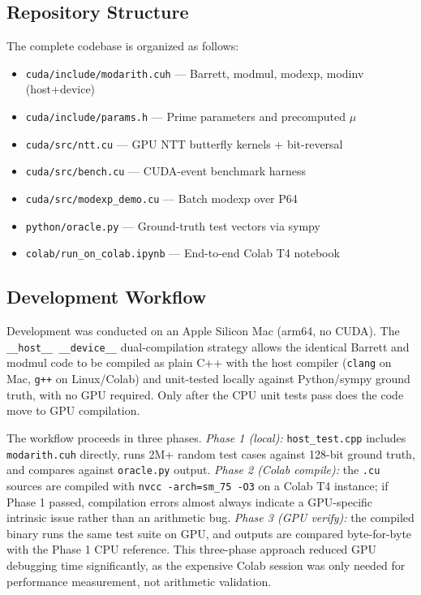 \documentclass[conference]{IEEEtran}
\begin{document}
\subsection{Repository Structure}

The complete codebase is organized as follows:
\begin{itemize}
  \item \texttt{cuda/include/modarith.cuh} --- Barrett, modmul, modexp, modinv (host+device)
  \item \texttt{cuda/include/params.h} --- Prime parameters and precomputed $\mu$
  \item \texttt{cuda/src/ntt.cu} --- GPU NTT butterfly kernels + bit-reversal
  \item \texttt{cuda/src/bench.cu} --- CUDA-event benchmark harness
  \item \texttt{cuda/src/modexp\_demo.cu} --- Batch modexp over P64
  \item \texttt{python/oracle.py} --- Ground-truth test vectors via sympy
  \item \texttt{colab/run\_on\_colab.ipynb} --- End-to-end Colab T4 notebook
\end{itemize}

\subsection{Development Workflow}

Development was conducted on an Apple Silicon Mac (arm64, no CUDA). The
\texttt{\_\_host\_\_ \_\_device\_\_} dual-compilation strategy allows the
identical Barrett and modmul code to be compiled as plain C++ with the host compiler (\texttt{clang} on Mac, \texttt{g++} on Linux/Colab)
and unit-tested locally against Python/sympy ground truth, with no GPU required.
Only after the CPU unit tests pass does the code move to GPU compilation.

The workflow proceeds in three phases. \emph{Phase 1 (local):} \texttt{host\_test.cpp}
includes \texttt{modarith.cuh} directly, runs 2M+ random test cases against
128-bit ground truth, and compares against \texttt{oracle.py} output. \emph{Phase 2
(Colab compile):} the \texttt{.cu} sources are compiled with \texttt{nvcc -arch=sm\_75
-O3} on a Colab T4 instance; if Phase 1 passed, compilation errors almost always
indicate a GPU-specific intrinsic issue rather than an arithmetic bug. \emph{Phase 3
(GPU verify):} the compiled binary runs the same test suite on GPU, and outputs
are compared byte-for-byte with the Phase 1 CPU reference. This three-phase
approach reduced GPU debugging time significantly, as the expensive Colab session
was only needed for performance measurement, not arithmetic validation.
\end{document}
